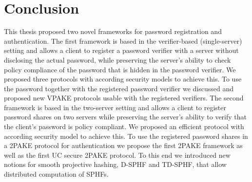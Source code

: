 \chapter{Conclusion} \label{ch:conclusion}

This thesis proposed two novel frameworks for password registration and authentication.
The first framework is based in the verifier-based (single-server) setting and allows a client to register a password verifier with a server without disclosing the actual password, while preserving the server's ability to check policy compliance of the password that is hidden in the password verifier.
We proposed three protocols with according security models to achieve this.
To use the password together with the registered password verifier we discussed and proposed new \ac{VPAKE} protocols usable with the registered verifiers.
The second framework is based in the two-server setting and allows a client to register password shares on two servers while preserving the server's ability to verify that the client's password is policy compliant.
We proposed an efficient protocol with according security model to achieve this.
To use the registered password shares in a \ac{2PAKE} protocol for authentication we propose the first \ac{2PAKE} framework as well as the first \ac{UC} secure \ac{2PAKE} protocol.
To this end we introduced new notions for smooth projective hashing, \ie \acl{D-SPHF} and \acl{TD-SPHF}, that allow distributed computation of \acp{SPHF}.
